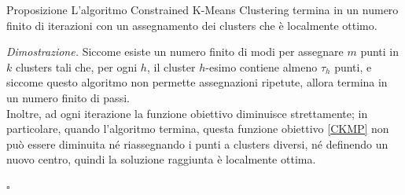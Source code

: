 \documentclass{beamer}
\begin{document}
\begin{frame}
	\begin{exampleblock}{Proposizione}
		L'algoritmo Constrained K-Means Clustering termina in un numero finito di iterazioni con un assegnamento dei clusters che è localmente ottimo.
	\end{exampleblock}
	\textit{Dimostrazione.} Siccome esiste un numero finito di modi per assegnare $m$ punti in $k$ clusters tali che, per ogni $h$, il cluster $h$-esimo contiene almeno $\tau_h$ punti, e siccome questo algoritmo non permette assegnazioni ripetute, allora termina in un numero finito di passi.\\
	Inoltre, ad ogni iterazione la funzione obiettivo diminuisce strettamente; in particolare, quando l'algoritmo termina, questa funzione obiettivo \eqref{CKMP} non può essere diminuita né riassegnando i punti a clusters diversi, né definendo un nuovo centro, quindi la soluzione raggiunta è localmente ottima.\vspace{-0.5cm}\begin{flushright}$ \square$\end{flushright}
\end{frame}
\end{document}
